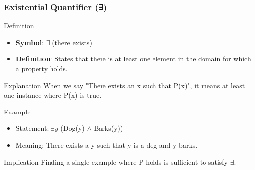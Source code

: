 \documentclass[aspectratio=169]{beamer}
\begin{document}
\begin{frame}[fragile]
    \frametitle{Existential Quantifier (∃)}
    \begin{block}{Definition}
        \begin{itemize}
            \item \textbf{Symbol}: $\exists$ (there exists)
            \item \textbf{Definition}: States that there is at least one element in the domain for which a property holds.
        \end{itemize}
    \end{block}
    
    \begin{block}{Explanation}
        When we say "There exists an x such that P(x)", it means at least one instance where P(x) is true.
    \end{block}

    \begin{block}{Example}
        \begin{itemize}
            \item Statement: $\exists y$ (Dog(y) $\land$ Barks(y))
            \item Meaning: There exists a y such that y is a dog and y barks.
        \end{itemize}
    \end{block}
    
    \begin{block}{Implication}
        Finding a single example where P holds is sufficient to satisfy $\exists$.
    \end{block}
\end{frame}
\end{document}
